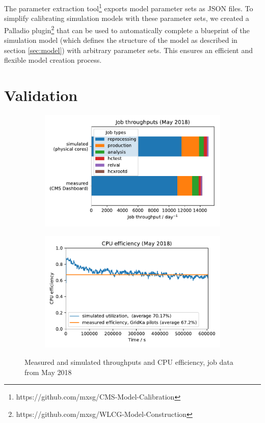 \documentclass{webofc}
\begin{document}
The parameter extraction tool\footnote{https://github.com/mxsg/CMS-Model-Calibration} exports model parameter sets as JSON files.
To simplify calibrating simulation models with these parameter sets, we created a Palladio plugin\footnote{https://github.com/mxsg/WLCG-Model-Construction} that can be used to automatically complete a blueprint of the simulation model (which defines the structure of the model as described in section \ref{sec:model}) with arbitrary parameter sets.
This ensures an efficient and flexible model creation process.

\section{Validation}
\label{validation}

\begin{figure}
    \centering
    \begin{subfigure}{0.48\linewidth}
        \includegraphics[width=\linewidth]{images/validation/throughputs}
    \end{subfigure}
    \begin{subfigure}{0.48\linewidth}
        \includegraphics[width=\linewidth]{images/validation/utilizations}
    \end{subfigure}
    \caption{Measured and simulated throughputs and CPU efficiency, job data from May 2018}
    \label{fig:validation}
\end{figure}
\end{document}
